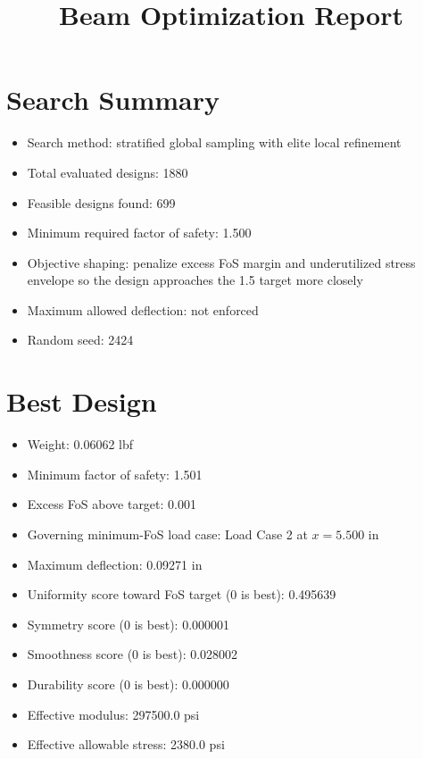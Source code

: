 \documentclass[11pt]{article}
\title{Beam Optimization Report}
\date{}
\begin{document}
\maketitle

\section*{Search Summary}
\begin{itemize}
\item Search method: stratified global sampling with elite local refinement
\item Total evaluated designs: 1880
\item Feasible designs found: 699
\item Minimum required factor of safety: 1.500
\item Objective shaping: penalize excess FoS margin and underutilized stress envelope so the design approaches the 1.5 target more closely
\item Maximum allowed deflection: not enforced
\item Random seed: 2424
\end{itemize}

\section*{Best Design}
\begin{itemize}
\item Weight: 0.06062 lbf
\item Minimum factor of safety: 1.501
\item Excess FoS above target: 0.001
\item Governing minimum-FoS load case: Load Case 2 at $x=5.500$ in
\item Maximum deflection: 0.09271 in
\item Uniformity score toward FoS target (0 is best): 0.495639
\item Symmetry score (0 is best): 0.000001
\item Smoothness score (0 is best): 0.028002
\item Durability score (0 is best): 0.000000
\item Effective modulus: 297500.0 psi
\item Effective allowable stress: 2380.0 psi
\end{itemize}
\end{document}
